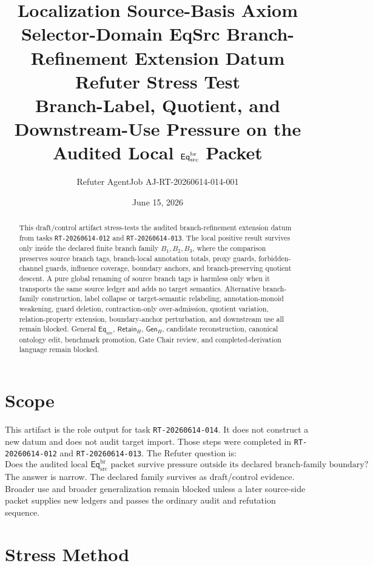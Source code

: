 \documentclass[11pt]{article}
\title{\textbf{Localization Source-Basis Axiom Selector-Domain EqSrc Branch-Refinement Extension Datum Refuter Stress Test}\\[0.35em]
\large Branch-Label, Quotient, and Downstream-Use Pressure on the Audited Local \(\EqBr\) Packet}
\author{Refuter AgentJob AJ-RT-20260614-014-001}
\date{June 15, 2026}
\newcommand{\EqSrc}{\mathsf{Eq}_{\mathrm{src}}}
\newcommand{\EqBr}{\mathsf{Eq}_{\mathrm{src}}^{\mathrm{br}}}
\newcommand{\RetainH}{\mathsf{Retain}_{H}}
\newcommand{\GenH}{\mathsf{Gen}_{H}}
\begin{document}
\maketitle

\begin{abstract}
This draft/control artifact stress-tests the audited branch-refinement
extension datum from tasks \texttt{RT-20260614-012} and
\texttt{RT-20260614-013}. The local positive result survives only inside
the declared finite branch family \(B_{1},B_{2},B_{3}\), where the
comparison preserves source branch tags, branch-local annotation totals,
proxy guards, forbidden-channel guards, influence coverage, boundary
anchors, and branch-preserving quotient descent. A pure global renaming
of source branch tags is harmless only when it transports the same source
ledger and adds no target semantics. Alternative branch-family
construction, label collapse or target-semantic relabeling,
annotation-monoid weakening, guard deletion, contraction-only
over-admission, quotient variation, relation-property extension,
boundary-anchor perturbation, and downstream use all remain blocked.
General \(\EqSrc\), \(\RetainH\), \(\GenH\), candidate reconstruction,
canonical ontology edit, benchmark promotion, Gate Chair review, and
completed-derivation language remain blocked.
\end{abstract}

\section{Scope}

This artifact is the role output for task \texttt{RT-20260614-014}. It
does not construct a new datum and does not audit target import. Those
steps were completed in \texttt{RT-20260614-012} and
\texttt{RT-20260614-013}. The Refuter question is:
\[
    \text{Does the audited local }\EqBr\text{ packet survive pressure
    outside its declared branch-family boundary?}
\]
The answer is narrow. The declared family survives as draft/control
evidence. Broader use and broader generalization remain blocked unless a
later source-side packet supplies new ledgers and passes the ordinary
audit and refutation sequence.

\section{Stress Method}
\end{document}
